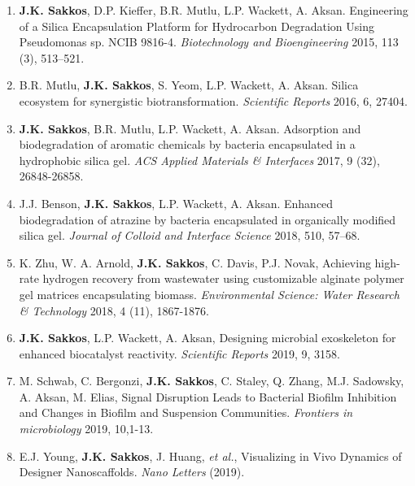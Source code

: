 

\begin{cvparagraph}
\begin{enumerate}
	\item	{\textbf{J.K. Sakkos}, D.P. Kieffer, B.R. Mutlu, L.P. Wackett, A. Aksan. Engineering of a Silica Encapsulation Platform for Hydrocarbon Degradation Using Pseudomonas sp. NCIB 9816-4. \textit{Biotechnology and Bioengineering} 2015, 113 (3), 513–521.}
	\item	{B.R. Mutlu, \textbf{J.K. Sakkos}, S. Yeom, L.P. Wackett, A. Aksan. Silica ecosystem for synergistic biotransformation. \textit{Scientific Reports} 2016, 6, 27404.}
	\item {\textbf{J.K. Sakkos}, B.R. Mutlu, L.P. Wackett, A. Aksan. Adsorption and biodegradation of aromatic chemicals by bacteria encapsulated in a hydrophobic silica gel. \textit{ACS Applied Materials \& Interfaces} 2017, 9 (32), 26848-26858.}
	\item {J.J. Benson, \textbf{J.K. Sakkos}, L.P. Wackett, A. Aksan. Enhanced biodegradation of atrazine by bacteria encapsulated in organically modified silica gel. \textit{Journal of Colloid and Interface Science} 2018, 510, 57–68.}
	\item {K. Zhu, W. A. Arnold, \textbf{J.K. Sakkos}, C. Davis, P.J. Novak, Achieving high-rate hydrogen recovery from wastewater using customizable alginate polymer gel matrices encapsulating biomass. \textit{Environmental Science: Water Research \& Technology} 2018, 4 (11), 1867-1876.}
	\item {\textbf{J.K. Sakkos}, L.P. Wackett, A. Aksan, Designing microbial exoskeleton for enhanced biocatalyst reactivity. \textit{Scientific Reports} 2019, 9,  3158.}
	\item {M. Schwab, C. Bergonzi, \textbf{J.K. Sakkos}, C. Staley, Q. Zhang, M.J. Sadowsky, A. Aksan, M. Elias, Signal Disruption Leads to Bacterial Biofilm Inhibition and Changes in Biofilm and Suspension Communities. \textit{Frontiers in microbiology} 2019, 10,1-13.}
	\item {E.J. Young, \textbf{J.K. Sakkos}, J. Huang, \textit{et al.}, Visualizing in Vivo Dynamics of Designer Nanoscaffolds. \textit{Nano Letters} (2019).}

\end{enumerate}
\end{cvparagraph}
